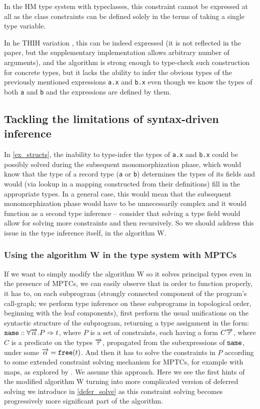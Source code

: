 In the HM type system with typeclasses, this constraint cannot be expressed at all as the class constraints can be defined solely in the terms of taking a single type variable.

In he THIH variation \cite{jones1999typing}, this can be indeed expressed (it is not reflected in the paper, but the supplementary implementation allows arbitrary number of arguments), and the algorithm is strong enough to type-check such construction for concrete types, but it lacks the ability to infer the obvious types of the previously mentioned expressions \lstinline{a.x} and \lstinline{b.x} even though we know the types of both \lstinline{a} and \lstinline{b} and the expressions are defined by them.

\subsection{Tackling the limitations of syntax-driven inference}


In \cref{ex_structs}, the inability to type-infer the types of \lstinline{a.x} and \lstinline{b.x} could be possibly solved during the subsequent monomorphization phase, which would know that the type of a record type (\lstinline{a} or \lstinline{b}) determines the types of its fields and would (via lookup in a mapping constructed from their definitions) fill in the appropriate types. In a general case, this would mean that the subsequent monomorphization phase would have to be unnecessarily complex and it would function as a second type inference -- consider that solving a type field would allow for solving more constraints and then recursively. So we should address this issue in the type inference itself, in the algorithm W.

\subsubsection{Using the algorithm W in the type system with MPTCs}

If we want to simply modify the algorithm W so it solves principal types even in the presence of MPTCs, we can easily observe that in order to function properly, it has to, on each subprogram (strongly connected component of the program's call-graph; we perform type inference on these subprograms in topological order, beginning with the leaf components), first perform the usual unifications on the syntactic structure of the subprogram, returning a type assignment in the form: $\mathtt{name} :: \forall \overrightarrow{\alpha} . P  \Rightarrow t$, where $P$ is a set of constraints, each having a form $C \overrightarrow{\tau}$, where $C$ is a predicate on the types $\overrightarrow{\tau}$, propagated from the subexpressions of $\mathtt{name}$, under some $\overrightarrow{\alpha} = \mathtt{free} (t)$. And then it has to solve the constraints in $P$ according to some extended constraint solving mechanism for MPTCs, for example with maps, as explored by \cite{jones2000type}. We assume this approach. Here we see the first hints of the modified algorithm W turning into more complicated version of deferred solving we introduce in \cref{defer_solve} as this constraint solving becomes progressively more significant part of the algorithm.

